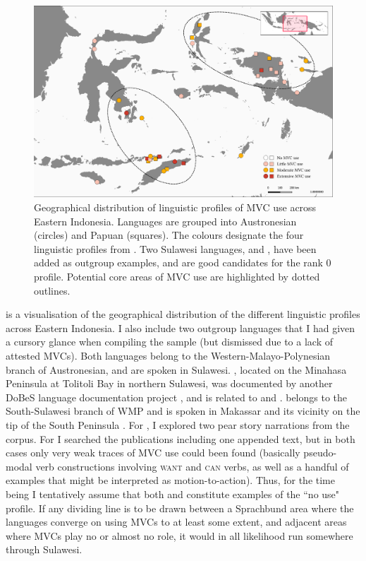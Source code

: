 \begin{figure}
\includegraphics[width=\textwidth]{figures/languages_mvcuse.pdf}
\caption[Geographical distribution of linguistic profiles of MVC use across Eastern Indonesia]{Geographical distribution of linguistic profiles of MVC use across Eastern Indonesia. Languages are grouped into Austronesian (circles) and Papuan (squares). The colours designate the four linguistic profiles from . Two Sulawesi languages,  and , have been added as outgroup examples, and are good candidates for the rank 0 profile. Potential core areas of MVC use are highlighted by dotted outlines.}\label{fig:map_profiles}
\end{figure}

 is a visualisation of the geographical distribution of the different linguistic profiles across Eastern Indonesia. I also include two outgroup languages that I had given a cursory glance when compiling the sample (but dismissed due to a lack of attested MVCs). Both languages belong to the Western-Malayo-Polynesian branch of Austronesian, and are spoken in Sulawesi. , located on the Minahasa Peninsula at Tolitoli Bay in northern Sulawesi, was documented by another DoBeS language documentation project \citep{leto2012totoli}, and is related to  and .  belongs to the South-Sulawesi branch of WMP and is spoken in Makassar and its vicinity on the tip of the South Peninsula \citep{jukes2005makassar, jukes2006makassarese}. For , I explored two pear story narrations from the  corpus. For  I searched the publications including one appended text, but in both cases only very weak traces of MVC use could been found (basically pseudo-modal verb constructions involving \textsc{want} and \textsc{can} verbs, as well as a handful of examples that might be interpreted as motion-to-action). Thus, for the time being I tentatively assume that both  and  constitute examples of the ``no use" profile. If any dividing line is to be drawn between a Sprachbund area where the languages converge on using MVCs to at least some extent, and adjacent areas where MVCs play no or almost no role, it would in all likelihood run somewhere through Sulawesi.

